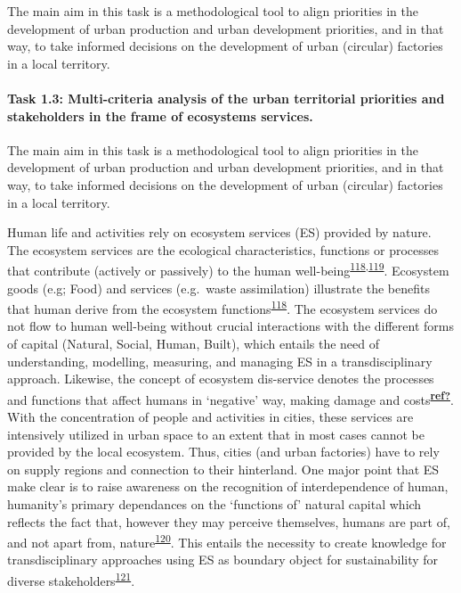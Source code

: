 \documentclass[
  12pt,
  a4paperpaper,
  onecolumn]{article}
\let\oldparagraph\paragraph
\renewcommand{\paragraph}[1]{\oldparagraph{#1}\mbox{}}
\let\paragraph\oldparagraph
\begin{document}
The main aim in this task is a methodological tool to align priorities
in the development of urban production and urban development priorities,
and in that way, to take informed decisions on the development of urban
(circular) factories in a local territory.

\hypertarget{task-1.3-multi-criteria-analysis-of-the-urban-territorial-priorities-and-stakeholders-in-the-frame-of-ecosystems-services.}{%
\paragraph{Task 1.3: Multi-criteria analysis of the urban territorial
priorities and stakeholders in the frame of ecosystems
services.}\label{task-1.3-multi-criteria-analysis-of-the-urban-territorial-priorities-and-stakeholders-in-the-frame-of-ecosystems-services.}}

The main aim in this task is a methodological tool to align priorities
in the development of urban production and urban development priorities,
and in that way, to take informed decisions on the development of urban
(circular) factories in a local territory.

Human life and activities rely on ecosystem services (ES) provided by
nature. The ecosystem services are the ecological characteristics,
functions or processes that contribute (actively or passively) to the
human
well-being\textsuperscript{\protect\hyperlink{ref-Costanza1997}{118},\protect\hyperlink{ref-Costanza2017}{119}}.
Ecosystem goods (e.g; Food) and services (e.g.~waste assimilation)
illustrate the benefits that human derive from the ecosystem
functions\textsuperscript{\protect\hyperlink{ref-Costanza1997}{118}}.
The ecosystem services do not flow to human well-being without crucial
interactions with the different forms of capital (Natural, Social,
Human, Built), which entails the need of understanding, modelling,
measuring, and managing ES in a transdisciplinary approach. Likewise,
the concept of ecosystem dis-service denotes the processes and functions
that affect humans in `negative' way, making damage and
costs\textsuperscript{\protect\hyperlink{ref-ref}{\textbf{ref?}}}. With
the concentration of people and activities in cities, these services are
intensively utilized in urban space to an extent that in most cases
cannot be provided by the local ecosystem. Thus, cities (and urban
factories) have to rely on supply regions and connection to their
hinterland. One major point that ES make clear is to raise awareness on
the recognition of interdependence of human, humanity's primary
dependances on the `functions of' natural capital which reflects the
fact that, however they may perceive themselves, humans are part of, and
not apart from,
nature\textsuperscript{\protect\hyperlink{ref-Ekins2003}{120}}. This
entails the necessity to create knowledge for transdisciplinary
approaches using ES as boundary object for sustainability for diverse
stakeholders\textsuperscript{\protect\hyperlink{ref-Honeck2021}{121}}.
\end{document}
